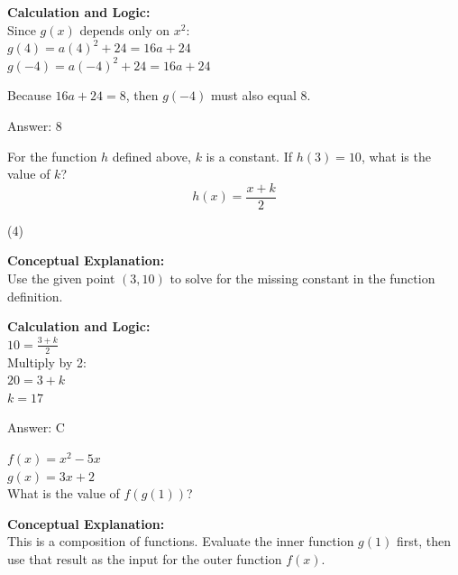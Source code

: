 \documentclass[11pt,paper=a4,answers]{exam}
\begin{document}
\begin{questions}
\begin{solution}
\textbf{Calculation and Logic:} \\
Since $g(x)$ depends only on $x^2$: \\
$g(4) = a(4)^2 + 24 = 16a + 24$ \\
$g(-4) = a(-4)^2 + 24 = 16a + 24$

\vspace{10pt}

Because $16a + 24 = 8$, then $g(-4)$ must also equal 8.

\vspace{25pt}

Answer: \colorbox{yellow!100}{8}
\end{solution}

\vspace{40pt}

\question
For the function $h$ defined above, $k$ is a constant. If $h(3) = 10$, what is the value of $k$?
\[ h(x) = \frac{x+k}{2} \]
\begin{tasks}(4)
\end{tasks}

\begin{solution}
\textbf{Conceptual Explanation:} \\
Use the given point $(3, 10)$ to solve for the missing constant in the function definition.

\vspace{20pt}

\textbf{Calculation and Logic:} \\
$10 = \frac{3 + k}{2}$ \\
Multiply by 2: \\
$20 = 3 + k$ \\
$k = 17$

\vspace{25pt}

Answer: \colorbox{yellow!100}{C}
\end{solution}

\vspace{40pt}

\question
$f(x) = x^2 - 5x$ \\
$g(x) = 3x + 2$ \\
What is the value of $f(g(1))$?

\begin{solution}
\textbf{Conceptual Explanation:} \\
This is a composition of functions. Evaluate the inner function $g(1)$ first, then use that result as the input for the outer function $f(x)$.


\end{solution}
\end{questions}
\end{document}
